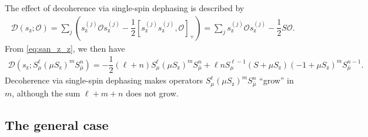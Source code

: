 \documentclass[pra,reprint,longbibliography]{revtex4-1}
\newcommand{\f}[2]{\dfrac{#1}{#2}} %
\newcommand{\p}[1]{\left(#1\right)} %
\renewcommand{\sp}[1]{\left[#1\right]} %
\newcommand{\D}{\mathcal{D}}
\renewcommand{\O}{\mathcal{O}}
\newcommand{\z}{\text{z}}
\newcommand{\bmu}{{\bar\mu}}
\newcommand{\1}{\mathds{1}}
\begin{document}
The effect of decoherence via single-spin dephasing is described by
\begin{align}
  \D\p{s_\z; \O}
  = \sum_j\p{s_\z^{(j)} \O s_\z^{(j)}
    - \f12\sp{s_\z^{(j)} s_\z^{(j)},\O}_+}
  = \sum_j s_\z^{(j)} \O s_\z^{(j)} - \f12 S \O.
\end{align}
From \eqref{eq:san_z_z}, we then have
\begin{align}
  \D\p{s_\z; S_\mu^\ell \p{\mu S_\z}^m S_\bmu^n}
  = -\f12\p{\ell+n} S_\mu^\ell \p{\mu S_\z}^m S_\bmu^n
  + \ell n S_\mu^{\ell-1} \p{S + \mu S_\z}
  \p{-1 + \mu S_\z}^m S_\bmu^{n-1}.
\end{align}
Decoherence via single-spin dephasing makes operators
$S_\mu^\ell \p{\mu S_\z}^m S_\bmu^n$ ``grow'' in $m$, although the sum
$\ell+m+n$ does not grow.


\subsection{The general case}
\label{sec:general_single}
\end{document}
